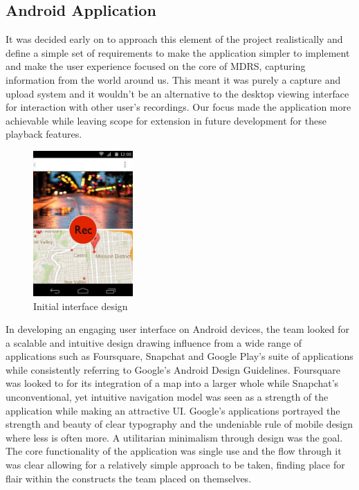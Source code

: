 \documentclass{l3proj}
\begin{document}
\subsection{Android Application} It was decided early on to approach this
element of the project realistically and define a simple set of requirements to
make the application simpler to implement and make the user experience focused
on the core of MDRS, capturing information from the world around us. This meant
it was purely a capture and upload system and it wouldn’t be an alternative to
the desktop viewing interface for interaction with other user’s recordings. Our
focus made the application more achievable while leaving scope for extension in
future development for these playback features.

\begin{figure}
  \begin{center}
    \includegraphics[width=0.34\textwidth]{images/android-digital-prototype-1.jpg}
  \end{center}
  \caption{Initial interface design}
\end{figure}

In developing an engaging user interface on Android devices, the team looked for
a scalable and intuitive design drawing influence from a wide range of
applications such as Foursquare, Snapchat and Google Play’s suite of
applications while consistently referring to Google’s Android Design Guidelines.
Foursquare was looked to for its integration of a map into a larger whole while
Snapchat’s unconventional, yet intuitive navigation model was seen as a strength
of the application while making an attractive UI. Google’s applications
portrayed the strength and beauty of clear typography and the undeniable rule of
mobile design where less is often more. A utilitarian minimalism through design
was the goal. The core functionality of the application was single use and the
flow through it was clear allowing for a relatively simple approach to be taken,
finding place for flair within the constructs the team placed on themselves.
\end{document}

